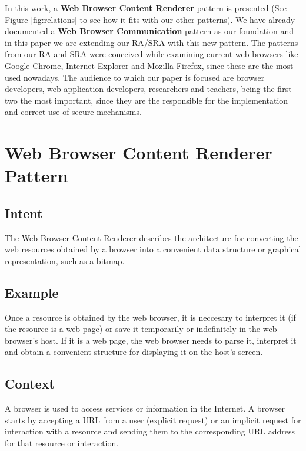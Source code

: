 \documentclass[]{acmlarge}
\begin{document}
In this work, a \textbf{Web Browser Content Renderer} pattern is presented (See Figure \ref{fig:relations} to see how it fits with our other patterns). We have already documented a \textbf{Web Browser Communication} pattern \cite{silva2015} as our foundation and in this paper we are extending our RA/SRA with this new pattern. %
The patterns from our RA and SRA were conceived while examining current web browsers like Google Chrome, Internet Explorer and Mozilla Firefox, since these are the most used nowadays. The audience to which our paper is focused are browser developers, web application developers, researchers and teachers, being the first two the most important, since they are the responsible for the implementation and correct use of secure mechanisms. 


\section{Web Browser Content Renderer Pattern}

  \subsection*{Intent}

  The Web Browser Content Renderer describes the architecture for converting the web resources obtained by a browser into a convenient data structure \cite{gpuchrome} or graphical representation, such as a bitmap.%

  \subsection*{Example}
  Once a resource is obtained by the web browser, it is neccesary to interpret it (if the resource is a web page) or save it temporarily or indefinitely in the web browser's host. If it is a web page, the web browser needs to parse it, interpret it and obtain a convenient structure for displaying it on the host's screen.
  
  \subsection*{Context}
  A browser is used to access services or information in the Internet. A browser starts by accepting a URL from a user (explicit request) or an implicit request for interaction with a resource and sending them to the corresponding URL address for that resource or interaction.%
\end{document}
